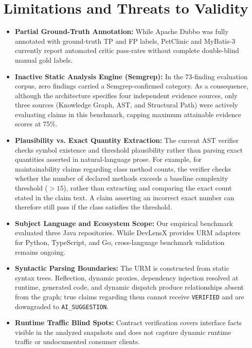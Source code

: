 \documentclass[runningheads]{llncs}
\begin{document}
\section{Limitations and Threats to Validity}
\begin{itemize}
    \item \textbf{Partial Ground-Truth Annotation:} While Apache Dubbo was fully annotated with ground-truth TP and FP labels, PetClinic and MyBatis-3 currently report automated critic pass-rates without complete double-blind manual gold labels.
    \item \textbf{Inactive Static Analysis Engine (Semgrep):} In the 73-finding evaluation corpus, zero findings carried a Semgrep-confirmed category. As a consequence, although the architecture specifies four independent evidence sources, only three sources (Knowledge Graph, AST, and Structural Path) were actively evaluating claims in this benchmark, capping maximum attainable evidence scores at 75\%.
    \item \textbf{Plausibility vs. Exact Quantity Extraction:} The current AST verifier checks symbol existence and threshold plausibility rather than parsing exact quantities asserted in natural-language prose. For example, for maintainability claims regarding class method counts, the verifier checks whether the number of declared methods exceeds a baseline complexity threshold ($>15$), rather than extracting and comparing the exact count stated in the claim text. A claim asserting an incorrect exact number can therefore still pass if the class satisfies the threshold.
    \item \textbf{Subject Language and Ecosystem Scope:} Our empirical benchmark evaluated three Java repositories. While DevLensX provides URM adapters for Python, TypeScript, and Go, cross-language benchmark validation remains ongoing.
    \item \textbf{Syntactic Parsing Boundaries:} The URM is constructed from static syntax trees. Reflection, dynamic proxies, dependency injection resolved at runtime, generated code, and dynamic dispatch produce relationships absent from the graph; true claims regarding them cannot receive \texttt{VERIFIED} and are downgraded to \texttt{AI\_SUGGESTION}.
    \item \textbf{Runtime Traffic Blind Spots:} Contract verification covers interface facts visible in the analyzed snapshots and does not capture dynamic runtime traffic or undocumented consumer clients.
\end{itemize}
\end{document}
